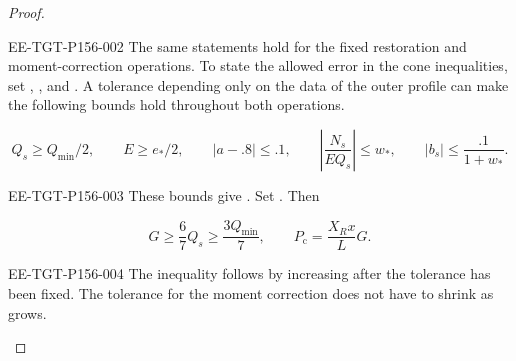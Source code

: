 \begin{proof}
\begin{EESegment}{EE-TGT-P156-002}
The same statements hold for the fixed restoration and moment-correction operations. To state the
allowed error in the cone inequalities, set
,
, and
. A tolerance depending only on the data of
the outer profile can make the following bounds hold throughout both operations.
\end{EESegment}
\begin{equation}
  Q_s\geq Q_{\min}/2,\qquad
  E\geq e_*/2,\qquad
  |a-.8|\leq.1,\qquad
  \left|\frac{N_s}{EQ_s}\right|\leq w_*,\qquad
  |b_s|\leq\frac{.1}{1+w_*}.
\tag{B.36}\label{eq:B.36}
\end{equation}
\begin{EESegment}{EE-TGT-P156-003}
These bounds give . Set
. Then
\end{EESegment}
\begin{equation}
  G\geq\frac67Q_s\geq\frac{3Q_{\min}}7,
  \qquad
  P_{\mathrm c}=\frac{X_Rx}{L}G.
\tag{B.37}\label{eq:B.37}
\end{equation}
\begin{EESegment}{EE-TGT-P156-004}
The inequality  follows by increasing
 after the tolerance has been fixed. The tolerance for the moment correction does not have to
shrink as  grows.
\end{EESegment}


\end{proof}
